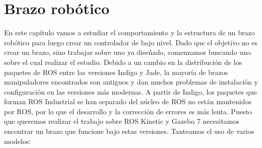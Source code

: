 \chapter{Brazo robótico}
\label{ch:BrazoRobotico}

En este capítulo vamos a estudiar el comportamiento y la estructura de un brazo robótico para luego crear un controlador de bajo nivel. Dado que el objetivo no es crear un brazo, sino trabajar sobre uno ya diseñado, comenzamos buscando uno sobre el cual realizar el estudio. Debido a un cambio en la distribución de los paquetes de ROS entre las versiones Indigo y Jade, la mayoría de brazos manipuladores encontrados son antiguos y dan muchos problemas de instalación y configuración en las versiones más modernas. A partir de Indigo, los paquetes que forman ROS Industrial se han separado del núcleo de ROS no están mantenidos por ROS, por lo que el desarrollo y la corrección de errores es más lenta. Puesto que queremos realizar el trabajo sobre ROS Kinetic y Gazebo 7 necesitamos encontrar un brazo que funcione bajo estas versiones. Tanteamos el uso de varios modelos:

